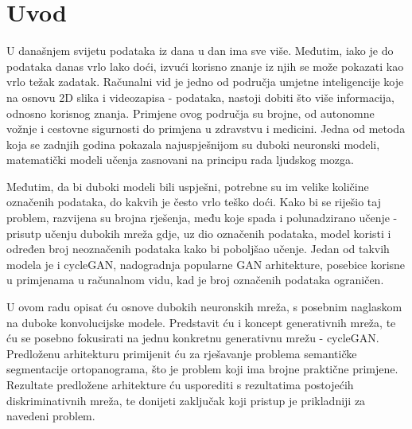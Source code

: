 \chapter{Uvod}
U današnjem svijetu podataka iz dana u dan ima sve više. Međutim, iako je do podataka danas vrlo lako doći, izvući korisno znanje iz njih se može pokazati kao vrlo težak zadatak. Računalni vid je jedno od područja umjetne inteligencije koje na osnovu 2D slika i videozapisa - podataka, nastoji dobiti što više informacija, odnosno korisnog znanja. Primjene ovog područja su brojne, od autonomne vožnje i cestovne sigurnosti do primjena u zdravstvu i medicini. Jedna od metoda koja se zadnjih godina pokazala najuspješnijom su duboki neuronski modeli, matematički modeli učenja zasnovani na principu rada ljudskog mozga.

Međutim, da bi duboki modeli bili uspješni, potrebne su im velike količine označenih podataka, do kakvih je često vrlo teško doći. Kako bi se riješio taj problem, razvijena su brojna rješenja, među koje spada i polunadzirano učenje - prisutp učenju dubokih mreža gdje, uz dio označenih podataka, model koristi i određen broj neoznačenih podataka kako bi poboljšao učenje. Jedan od takvih modela je i cycleGAN, nadogradnja popularne GAN arhitekture, posebice korisne u primjenama u računalnom vidu, kad je broj označenih podataka ograničen. 

U ovom radu opisat ću osnove dubokih neuronskih mreža, s posebnim naglaskom na duboke konvolucijske modele. Predstavit ću i koncept generativnih mreža, te ću se posebno fokusirati na jednu konkretnu generativnu mrežu - cycleGAN. Predloženu arhitekturu primijenit ću za rješavanje problema semantičke segmentacije ortopanograma, što je problem koji ima brojne praktične primjene. Rezultate predložene arhitekture ću usporediti s rezultatima postojećih diskriminativnih mreža, te donijeti zaključak koji pristup je prikladniji za navedeni problem.